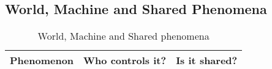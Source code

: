 \subsection{World, Machine and Shared Phenomena}

\begin{center}
    
\setlength\tabcolsep{7pt}
\renewcommand{\arraystretch}{2}
\begin{longtable}{ |m{7cm}|C{2.3cm}|C{1.6cm}|}
\caption{World, Machine and Shared phenomena\label{long}}\\
\hline
\endfirsthead
\endhead
\hline
\endlastfoot
{}
\textbf{Phenomenon} & \textbf{Who controls it?} & \textbf{Is it shared?}\\
\hline


\end{longtable}
\end{center}
